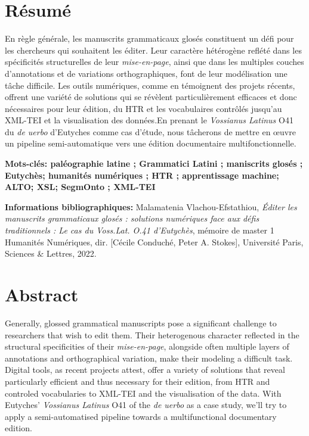 \documentclass[a4paper, twoside, 12pt]{book}
\begin{document}
\section*{Résumé}
En règle générale, les manuscrits grammaticaux glosés constituent un défi pour les chercheurs qui souhaitent les éditer. Leur caractère hétérogène reflété dans les spécificités structurelles de leur \textit{mise-en-page}, ainsi que dans les multiples couches d'annotations et de variations orthographiques, font de leur modélisation une tâche difficile. Les outils numériques, comme en témoignent des projets récents, offrent une variété de solutions qui se révèlent particulièrement efficaces et donc nécessaires pour leur édition, du HTR et les vocabulaires contrôlés jusqu'au XML-TEI et la visualisation des données.En prenant le \textit{Vossianus Latinus} O41 du \textit{de uerbo} d'Eutyches comme cas d'étude, nous tâcherons de mettre en œuvre un pipeline semi-automatique vers une édition documentaire multifonctionnelle.

\medskip

\textbf{Mots-clés: paléographie latine ; Grammatici Latini ; maniscrits glosés ; Eutychès; humanités numériques ; HTR ; apprentissage machine; ALTO; XSL; SegmOnto ; XML-TEI }

\textbf{Informations bibliographiques:} Malamatenia Vlachou-Efstathiou, \textit{Éditer les manuscrits grammaticaux glosés : solutions numériques face aux défis traditionnels : Le cas du \textit{Voss.Lat. O.41} d'Eutychès}, mémoire de master 1 \og Humanités Numériques\fg{}, dir. [Cécile Conduché, Peter A. Stokes], Université Paris, Sciences \& Lettres, 2022.


\section*{Abstract}
Generally, glossed grammatical manuscripts pose a significant challenge to researchers that wish to edit them. Their heterogenous character reflected in the structural specificities of their \textit{mise-en-page}, alongside often multiple layers of annotations and orthographical variation, make their modeling a difficult task. Digital tools, as recent projects attest, offer a variety of solutions that reveal particularly efficient and thus necessary for their edition, from HTR and controled vocabularies to XML-TEI and the visualisation of the data. With Eutyches' \textit{Vossianus Latinus} O41 of the \textit{de uerbo} as a case study, we'll try to apply a semi-automatised pipeline towards a multifunctional documentary edition.
\end{document}
